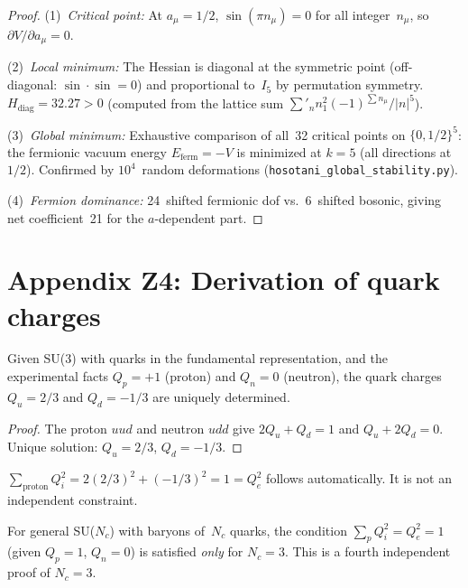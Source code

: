 \begin{proof}
(1)~\emph{Critical point:} At $a_\mu=1/2$, $\sin(\pi n_\mu)=0$ for all
integer~$n_\mu$, so $\partial V/\partial a_\mu=0$.

(2)~\emph{Local minimum:} The Hessian is diagonal at the symmetric point
(off-diagonal: $\sin\cdot\sin=0$) and proportional to~$I_5$ by
permutation symmetry. $H_{\mathrm{diag}}=32.27>0$ (computed from the
lattice sum $\sum'_n n_1^2(-1)^{\sum n_\mu}/|n|^5$).

(3)~\emph{Global minimum:} Exhaustive comparison of all~32 critical points
on $\{0,1/2\}^5$: the fermionic vacuum energy $E_{\mathrm{ferm}}=-V$ is
minimized at $k=5$ (all directions at $1/2$). Confirmed by $10^4$~random
deformations (\texttt{hosotani\_global\_stability.py}).

(4)~\emph{Fermion dominance:} 24~shifted fermionic dof vs.\
6~shifted bosonic, giving net coefficient~21 for the $a$-dependent part.
\end{proof}

\section{Appendix Z4: Derivation of quark charges}
\label{app:quarks}

\begin{theorem}\label{thm:quarks}
Given SU(3) with quarks in the fundamental representation, and the
experimental facts $Q_p=+1$ (proton) and $Q_n=0$ (neutron), the
quark charges $Q_u=2/3$ and $Q_d=-1/3$ are uniquely determined.
\end{theorem}

\begin{proof}
The proton $uud$ and neutron $udd$ give $2Q_u+Q_d=1$ and $Q_u+2Q_d=0$.
Unique solution: $Q_u=2/3$, $Q_d=-1/3$.
\end{proof}

\begin{corollary}\label{cor:alpha1}
$\sum_{\mathrm{proton}}Q_i^2 = 2(2/3)^2+(-1/3)^2=1=Q_e^2$ follows
automatically. It is not an independent constraint.
\end{corollary}

\begin{corollary}[$N_c=3$ from charge cancellation]\label{cor:Nc3charge}
For general SU($N_c$) with baryons of~$N_c$ quarks, the condition
$\sum_p Q_i^2=Q_e^2=1$ (given $Q_p=1$, $Q_n=0$) is satisfied \emph{only}
for $N_c=3$. This is a fourth independent proof of $N_c=3$.
\end{corollary}


